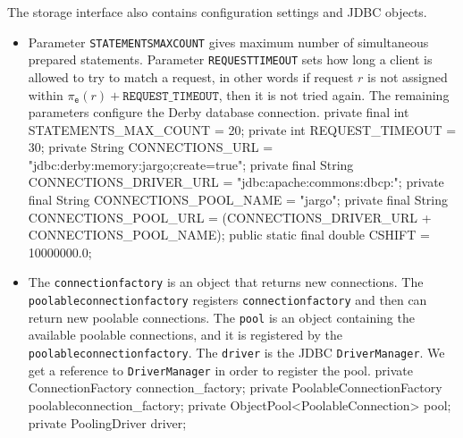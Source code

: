 The storage interface also contains configuration settings and JDBC objects.
\begin{itemize}
\item Parameter
{\tt{}STATEMENTS{}MAX{}COUNT} gives maximum number of simultaneous prepared
statements. Parameter {\tt{}REQUEST{}TIMEOUT} sets how long a client is allowed to
try to match a request, in other words if request $r$ is not assigned within
$\pi_\texttt{e}(r)+\texttt{REQUEST\_TIMEOUT}$, then it is not tried again.
The remaining parameters configure the Derby database connection.
\nwenddocs{}\plusendmoddef
private final int    STATEMENTS_MAX_COUNT   = 20;
private       int    REQUEST_TIMEOUT        = 30;
private       String CONNECTIONS_URL        = "jdbc:derby:memory:jargo;create=true";
private final String CONNECTIONS_DRIVER_URL = "jdbc:apache:commons:dbcp:";
private final String CONNECTIONS_POOL_NAME  = "jargo";
private final String CONNECTIONS_POOL_URL   = (CONNECTIONS_DRIVER_URL + CONNECTIONS_POOL_NAME);
public static final double CSHIFT           = 10000000.0;
\nwendcode{}\nwdocspar
\item The {\tt{}connection{}factory} is an object that returns new connections. The
{\tt{}poolableconnection{}factory} registers {\tt{}connection{}factory} and then can
return new poolable connections.  The {\tt{}pool} is an object containing the
available poolable connections, and it is registered by the
{\tt{}poolableconnection{}factory}. The {\tt{}driver} is the JDBC {\tt{}DriverManager}.
We get a reference to {\tt{}DriverManager} in order to register the pool.
\nwenddocs{}\plusendmoddef
private ConnectionFactory               connection_factory;
private PoolableConnectionFactory       poolableconnection_factory;
private ObjectPool<PoolableConnection>  pool;
private PoolingDriver                   driver;
\nwendcode{}\nwdocspar
\end{itemize}

